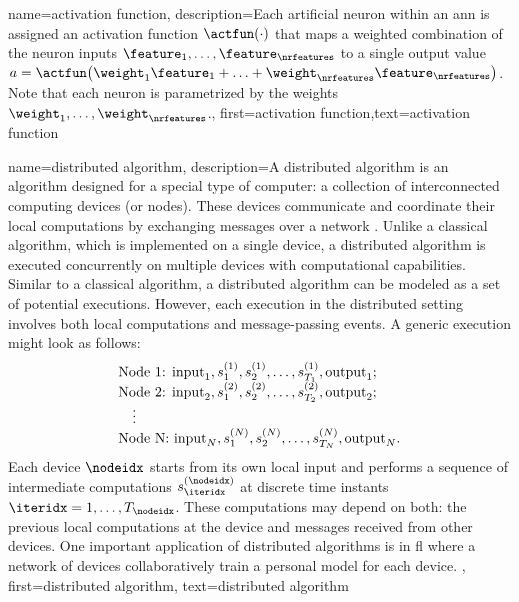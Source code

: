 {{
{name={activation function},
	description={Each artificial neuron within an \gls{ann} is 
		assigned an activation function $\actfun(\cdot)$ that maps a weighted combination of 
		the neuron inputs $\feature_{1},\ldots,\feature_{\nrfeatures}$ to a single output 
		value $a = \actfun\big(\weight_{1} \feature_{1}+\ldots+\weight_{\nrfeatures} \feature_{\nrfeatures} \big)$. 
		Note that each neuron is parametrized by the \gls{weights} $\weight_{1},\ldots,\weight_{\nrfeatures}$.},
first={activation function},text={activation function} 
}

{name={distributed algorithm},
	description={A distributed \gls{algorithm} is an \gls{algorithm} designed for 
		a special type of computer: a collection of interconnected computing devices (or nodes). 
		These devices communicate and coordinate their local computations by exchanging 
		messages over a network \cite{IntroDistAlg,ParallelDistrBook}. Unlike a classical \gls{algorithm}, 
		which is implemented on a single \gls{device}, a distributed \gls{algorithm} is 
		executed concurrently on multiple \gls{device}s with computational capabilities. 
		Similar to a classical \gls{algorithm}, a distributed \gls{algorithm} can be modeled as a 
		set of potential executions. However, each execution in the distributed setting involves 
		both local computations and message-passing events. A generic execution might look as 
		follows:
		\[
		\begin{array}{l}
			\text{Node 1: } {\rm input}_1, s_1^{(1)}, s_2^{(1)}, \ldots, s_{T_1}^{(1)}, {\rm output}_1; \\
			\text{Node 2: } {\rm input}_2, s_1^{(2)}, s_2^{(2)}, \ldots, s_{T_2}^{(2)}, {\rm output}_2; \\
			\quad \vdots \\
			\text{Node N: } {\rm input}_N, s_1^{(N)}, s_2^{(N)}, \ldots, s_{T_N}^{(N)}, {\rm output}_N.
		\end{array}
		\]
		Each \gls{device} $\nodeidx$ starts from its own local input and performs a sequence of 
		intermediate computations $s_{\iteridx}^{(\nodeidx)}$ at discrete time instants $\iteridx = 1, \dots, T_\nodeidx$. 
		These computations may depend on both: the previous local computations at the \gls{device} 
		and messages received from other \gls{device}s. One important application of distributed 
		\gls{algorithm}s is in \gls{fl} where a network of \gls{device}s collaboratively train a personal \gls{model} 
		for each \gls{device}. 
		},
	first={distributed algorithm}, text={distributed algorithm}
}


}}
